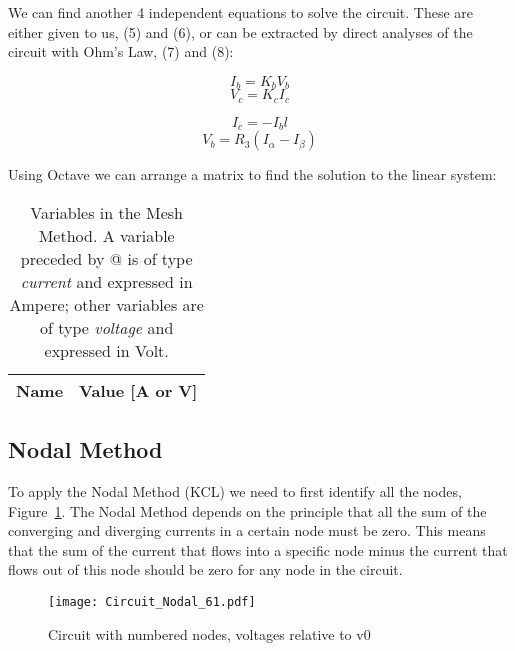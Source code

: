 We can find another 4 independent equations to solve the circuit. These are either given to us, (5) and (6), or can be extracted by direct analyses of the circuit with Ohm's Law, (7) and (8):

\begin{equation}
  I_b = K_bV_b
  \label{eq:Vb_Ib}
\end{equation}
\begin{equation}
  V_c = K_cI_c
  \label{eq:Vc_Ic}
\end{equation}

\begin{equation}
  I_c = - I_bl
  \label{eq:Ic}
\end{equation}
\begin{equation}
  V_b = R_3(I_{\alpha}-I_{\beta})
  \label{eq:Vb}
\end{equation}

Using Octave we can arrange a matrix to find the solution to the linear system:

\begin{table}[h]
  \centering
  \begin{tabular}{|l|r|}
    \hline    
    {\bf Name} & {\bf Value [A or V]} \\ \hline
    
  \end{tabular}
  \caption{Variables in the Mesh Method. A variable preceded by @ is of type {\em current} and expressed in Ampere; other variables are of type {\em voltage} and expressed in Volt.}
  \label{tab:malhas}
\end{table}

\subsection{Nodal Method}

To apply the Nodal Method (KCL) we need to first identify all the nodes, Figure~\ref{fig:Circuit_Nodal_Method}. The Nodal Method depends on the principle that all the sum of the converging and diverging currents in a certain node must be zero. This means that the sum of the current that flows into a specific node minus the current that flows out of this node should be zero for any node in the circuit.


\begin{figure}[h] \centering
\texttt{[image: Circuit\_Nodal\_61.pdf]}
\caption{Circuit with numbered nodes, voltages relative to v0}
\label{fig:Circuit_Nodal_Method}
\end{figure}

